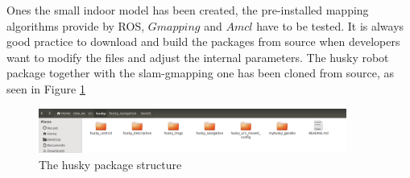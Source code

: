 \documentclass[11pt,a4paper]{article}
\begin{document}
Ones the small indoor model has been created, the pre-installed mapping algorithms provide by ROS, $Gmapping$ and $Amcl$ have to be tested. It is always good practice to download and build the packages from source when developers want to modify the files and adjust the internal parameters. The husky robot package together with the slam-gmapping one has been cloned from source, as seen in Figure \ref{fig:husky_str}

\begin{figure}[!htb]
	\center
	\includegraphics[width=0.9\textwidth]{figures/husky_pkg_struct.png}
	\caption{The husky package structure}
	\label{fig:husky_str}
\end{figure}
\end{document}
